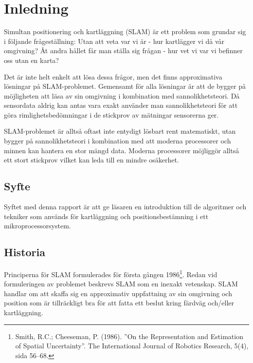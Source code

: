 \documentclass[a4paper,12pt,fleqn]{article}
\begin{document}
\addto\captionsswedish{\renewcommand{\contentsname}{Innehållsförteckning}}

\tableofcontents
\thispagestyle{fancy}
\newpage


\section{Inledning}

Simultan positionering och kartläggning (SLAM) är ett problem som grundar sig i följande frågeställning: Utan att veta var vi är - hur kartlägger vi då vår omgivning? Åt andra hållet får man ställa sig frågan - hur vet vi var vi befinner oss utan en karta?

Det är inte helt enkelt att lösa dessa frågor, men det finns approximativa lösningar på SLAM-problemet. Gemensamt för alla lösningar är att de bygger på möjligheten att läsa av sin omgivning i kombination med
sannolikhetsteori. Då sensordata aldrig kan antas vara exakt använder man sannolikhetsteori för att göra rimlighetsbedömningar i de stickprov av mätningar sensorerna ger.

SLAM-problemet är alltså oftast inte entydigt lösbart rent matematiskt, utan
bygger på sannolikhetsteori i kombination med att moderna processorer
och minnen kan hantera en stor mängd data. Moderna processorer möjliggör
alltså ett stort stickprov vilket kan leda till en mindre osäkerhet.

\subsection{Syfte}
Syftet med denna rapport är att ge läsaren en introduktion till de algoritmer och tekniker som används för kartläggning och positionsbestämning i ett mikroprocessorsystem.

\subsection{Historia}

Principerna för SLAM formulerades för första gången 1986\footnote{Smith, R.C.; Cheeseman, P. (1986).
''On the Representation and Estimation of Spatial Uncertainty''. The
International Journal of Robotics Research, 5(4), sida 56–68.}. Redan vid formuleringen av problemet beskrevs SLAM som en inexakt vetenskap. SLAM handlar om att skaffa sig en approximativ uppfattning av sin omgivning och position som är tillräckligt bra för att fatta ett beslut kring färdväg och/eller kartläggning. 
\end{document}
